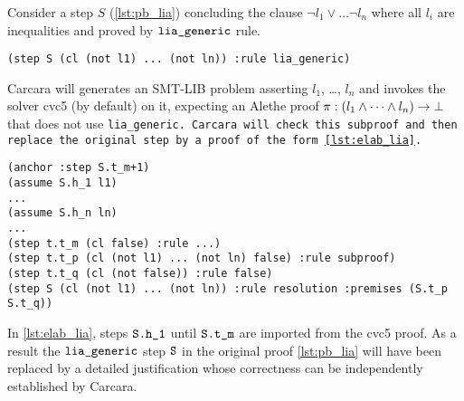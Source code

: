 \begin{example}

Consider a step $S$ (\cref{lst:pb_lia}) concluding the clause $\neg l_1 \lor \dots \neg l_n$ where all $l_i$ are inequalities and proved by $\tt{lia\_generic}$ rule.
    
\begin{lstlisting}[language=SMT,caption={Elaborated proof},label={lst:pb_lia}]
    (step S (cl (not l1) ... (not ln)) :rule lia_generic)
\end{lstlisting}
%
Carcara will generates an SMT-LIB problem asserting $l_1$, \dots, $l_n$ and invokes the solver cvc5 (by default) on it, expecting an Alethe proof $\pi : (l_1 \land \dots \land l_n) \ra \bot$
that does not use \tt{lia\_generic}. Carcara will check this subproof and then replace the original step by a proof of the form \cref{lst:elab_lia}.

\begin{lstlisting}[language=SMT,caption={Elaboration of \tt{lia\_generic}},label={lst:elab_lia}]
(anchor :step S.t_m+1)
(assume S.h_1 l1)
...
(assume S.h_n ln)
...
(step t.t_m (cl false) :rule ...)
(step t.t_p (cl (not l1) ... (not ln) false) :rule subproof)
(step t.t_q (cl (not false)) :rule false)
(step S (cl (not l1) ... (not ln)) :rule resolution :premises (S.t_p S.t_q))
\end{lstlisting}

In \cref{lst:elab_lia}, steps $\tt{S.h\_1}$ until $\tt{S.t\_m}$ are imported from the cvc5 proof.
As a result the $\tt{lia\_generic}$ step $\tt{S}$ in the original proof \cref{lst:pb_lia} will have been replaced by a detailed justification whose correctness can be independently established by Carcara.

\end{example}
